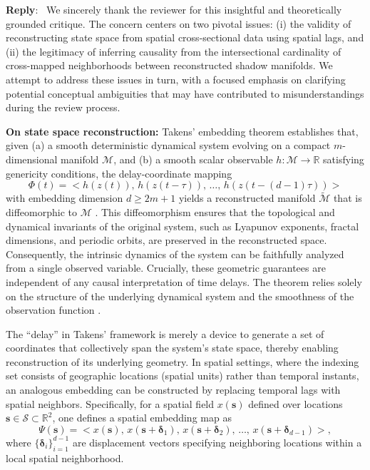 \documentclass[11pt]{article}
\newcounter{reviewer}
\newenvironment{reply}
   {\medskip \noindent \color{blue} \begin{sf}\textbf{Reply}:\  }
   {\medskip \par \end{sf}}
\begin{document}
\begin{reply}
We sincerely thank the reviewer for this insightful and theoretically grounded critique. The concern centers on two pivotal issues:  
(i) the validity of reconstructing state space from spatial cross-sectional data using spatial lags, and 
(ii) the legitimacy of inferring causality from the intersectional cardinality of cross-mapped neighborhoods between reconstructed shadow manifolds. We attempt to address these issues in turn, with a focused emphasis on clarifying potential conceptual ambiguities that may have contributed to misunderstandings during the review process.

\textbf{On state space reconstruction:}  
Takens' embedding theorem establishes that, given (a) a smooth deterministic dynamical system evolving on a compact $m$-dimensional manifold $\mathcal{M}$, and (b) a smooth scalar observable $h:\mathcal{M}\to\mathbb{R}$ satisfying genericity conditions, the delay-coordinate mapping
\[
\Phi(t) = \big< h(z(t)),\, h(z(t - \tau)),\, \dots,\, h(z(t - (d-1)\tau)) \big>
\]
with embedding dimension $d \geq 2m+1$ yields a reconstructed manifold $\tilde{\mathcal{M}}$ that is diffeomorphic to $\mathcal{M}$ \citep{Takens1981embedding,Mane1981embedding}. This diffeomorphism ensures that the topological and dynamical invariants of the original system, such as Lyapunov exponents, fractal dimensions, and periodic orbits, are preserved in the reconstructed space. Consequently, the intrinsic dynamics of the system can be faithfully analyzed from a single observed variable. Crucially, these geometric guarantees are independent of any causal interpretation of time delays. The theorem relies solely on the structure of the underlying dynamical system and the smoothness of the observation function \citep{sauer1991generalized_embedding_theorem1,wells2017generalized_embedding_theorem2}.

The ``delay'' in Takens' framework is merely a device to generate a set of coordinates that collectively span the system’s state space, thereby enabling reconstruction of its underlying geometry. In spatial settings, where the indexing set consists of geographic locations (spatial units) rather than temporal instants, an analogous embedding can be constructed by replacing temporal lags with spatial neighbors. Specifically, for a spatial field $x(\mathbf{s})$ defined over locations $\mathbf{s} \in \mathcal{S} \subset \mathbb{R}^2$, one defines a spatial embedding map as
\[
\Psi(\mathbf{s}) = \big< x(\mathbf{s}),\, x(\mathbf{s} + \boldsymbol{\delta}_1),\, x(\mathbf{s} + \boldsymbol{\delta}_2),\, \dots,\, x(\mathbf{s} + \boldsymbol{\delta}_{d-1}) \big>,
\]
where $\{\boldsymbol{\delta}_i\}_{i=1}^{d-1}$ are displacement vectors specifying neighboring locations within a local spatial neighborhood.


\end{reply}
\end{document}
